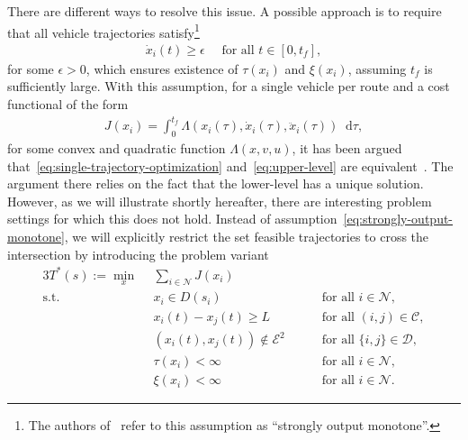 \documentclass[a4paper]{report}
\theoremstyle{definition}
\theoremstyle{plain}
\newcommand*\diff{\mathop{}\!\mathrm{d}}
\begin{document}
There are different ways to resolve this issue. A possible approach is to
require that all vehicle trajectories satisfy\footnote{The authors
  of~\cite{hultApproximateSolutionOptimal2015} refer to this assumption as ``strongly
  output monotone''.}
\begin{align}\label{eq:strongly-output-monotone}
  \dot{x}_{i}(t) \geq \epsilon \quad \text{ for all } t \in [0, t_{f}] ,
\end{align}
for some $\epsilon > 0$, which ensures
existence of $\tau(x_{i})$ and $\xi(x_{i})$, assuming $t_{f}$ is sufficiently large.
%
With this assumption, for a single vehicle per route and a cost functional of
the form
\begin{align}
  J(x_{i}) = \int_{0}^{t_{f}} \Lambda(x_{i}(\tau), \dot{x}_{i}(\tau), \ddot{x}_{i}(\tau)) \diff \tau ,
\end{align}
for some convex and quadratic function $\Lambda(x,v,u)$, it has been argued that~\eqref{eq:single-trajectory-optimization}
and~\eqref{eq:upper-level} are equivalent~\cite[Theorem 1]{hultTechnicalReportApproximate}.
%
The argument there relies on the fact that the lower-level has a unique
solution. However, as we will illustrate shortly hereafter, there are
interesting problem settings for which this does not hold.
%
Instead of assumption~\eqref{eq:strongly-output-monotone}, we will explicitly restrict the set feasible
trajectories to cross the intersection by introducing the problem variant
\begin{alignat}{3}\label{eq:single-trajectory-optimization-variant}
  T^{*}(s) := \min_{x} \;\, & \sum_{i \in \mathcal{N}} J(x_{i}) \tag{T*} \\
  \text{s.t. } \; & x_{i} \in D(s_{i}) && \quad \text{ for all } i \in \mathcal{N} , \tag{T.1} \\
           & x_{i}(t) - x_{j}(t) \geq L && \quad \text{ for all } (i,j) \in \mathcal{C} , \tag{T.2} \\
           & (x_{i}(t), x_{j}(t)) \notin \mathcal{E}^{2} && \quad\text{ for all } \{i, j\} \in \mathcal{D} , \tag{T.3} \label{eq:T*.3} \\
           & \tau(x_{i}) < \infty && \quad \text{ for all } i \in \mathcal{N} , \tag{T*.4} \label{eq:T4*} \\
           & \xi(x_{i}) < \infty && \quad  \text{ for all } i \in \mathcal{N} . \tag{T*.5} \label{eq:T5*}
\end{alignat}
\end{document}
